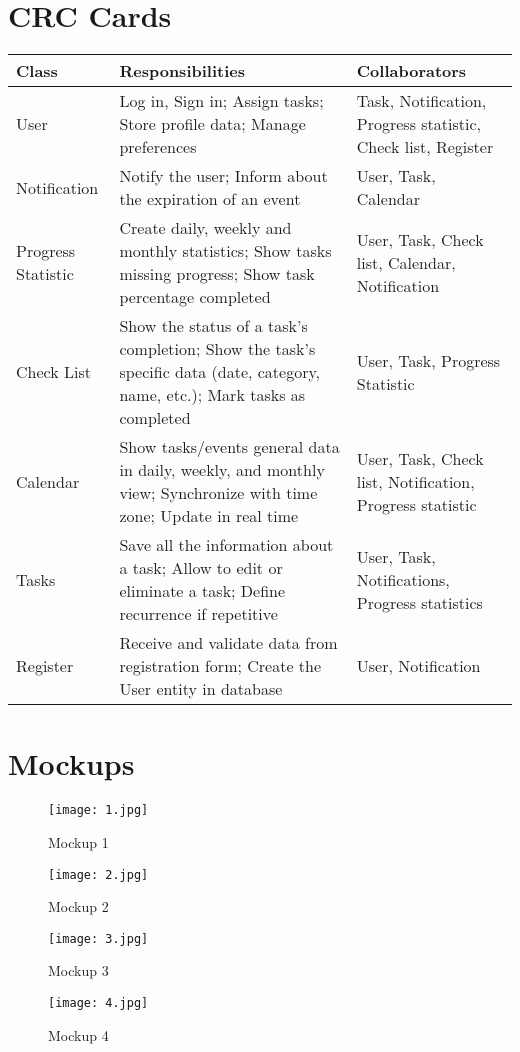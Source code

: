 \documentclass[man]{apa7}
\begin{document}
\section{CRC Cards}
\begin{longtable}{|p{3cm}|p{7cm}|p{6cm}|}
\hline
\textbf{Class} & \textbf{Responsibilities} & \textbf{Collaborators} \\
\hline
User & Log in, Sign in; Assign tasks; Store profile data; Manage preferences & Task, Notification, Progress statistic, Check list, Register \\
\hline
Notification & Notify the user; Inform about the expiration of an event & User, Task, Calendar \\
\hline
Progress Statistic & Create daily, weekly and monthly statistics; Show tasks missing progress; Show task percentage completed & User, Task, Check list, Calendar, Notification \\
\hline
Check List & Show the status of a task's completion; Show the task’s specific data (date, category, name, etc.); Mark tasks as completed & User, Task, Progress Statistic \\
\hline
Calendar & Show tasks/events general data in daily, weekly, and monthly view; Synchronize with time zone; Update in real time & User, Task, Check list, Notification, Progress statistic \\
\hline
Tasks & Save all the information about a task; Allow to edit or eliminate a task; Define recurrence if repetitive & User, Task, Notifications, Progress statistics \\
\hline
Register & Receive and validate data from registration form; Create the User entity in database & User, Notification \\
\hline
\end{longtable}

\section{Mockups}

\begin{figure}[H]
\centering
\texttt{[image: 1.jpg]}
\caption{Mockup 1}

\vspace{1cm}

\texttt{[image: 2.jpg]}
\caption{Mockup 2}
\end{figure}

\begin{figure}[H]
\centering
\texttt{[image: 3.jpg]}
\caption{Mockup 3}

\vspace{1cm}

\texttt{[image: 4.jpg]}
\caption{Mockup 4}
\end{figure}
\end{document}
